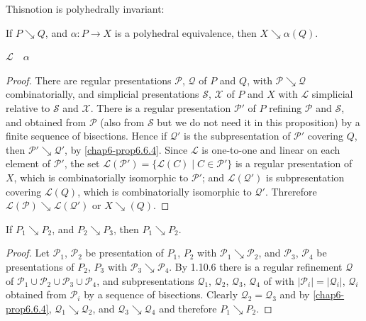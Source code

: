 This\pageoriginale notion is polyhedrally invariant:

\begin{proposition}\label{chap6-prop6.6.6}
If $P\searrow Q$, and $\alpha:P\to X$ is a polyhedral equivalence, then $X\searrow \alpha(Q)$.
\end{proposition}
$\mathcal{L} \quad  \alpha$
\begin{proof}
There are regular presentations $\mathscr{P}$, $\mathcal{Q}$ of $P$ and $Q$, with $\mathscr{P}\searrow \mathcal{Q}$ combinatorially, and simplicial presentations $\mathscr{S}$, $\mathscr{X}$ of $P$ and $X$ with $\mathcal{L}$ simplicial relative to $\mathscr{S}$ and $\mathscr{X}$. There is a regular presentation $\mathscr{P}'$ of $P$ refining $\mathscr{P}$ and $\mathscr{S}$, and obtained from $\mathscr{P}$ (also from $\mathscr{S}$ but we do not need it in this proposition) by a finite sequence of bisections. Hence if $\mathcal{Q}'$ is the subpresentation of $\mathscr{P}'$ covering $Q$, then $\mathscr{P}'\searrow \mathcal{Q}'$, by \ref{chap6-prop6.6.4}. Since $\mathcal{L}$ is one-to-one and linear on each element of $\mathscr{P}'$, the set $\mathcal{L}(\mathscr{P}')=\{\mathcal{L}(C)\mid C\in \mathscr{P}'\}$ is a regular presentation of $X$, which is combinatorially isomorphic to $\mathscr{P}'$; and $\mathcal{L}(\mathcal{Q}')$ is subpresentation covering $\mathcal{L}(Q)$, which is combinatorially isomorphic to $\mathcal{Q}'$. Threrefore $\mathcal{L}(\mathscr{P})\searrow \mathcal{L}(\mathcal{Q}')$ or $X\searrow (Q)$.
\end{proof}

\begin{proposition}\label{chap6-prop6.6.7}
If $P_{1}\searrow P_{2}$, and $P_{2}\searrow P_{3}$, then $P_{1}\searrow P_{2}$.
\end{proposition}

\begin{proof}
Let $\mathscr{P}_{1}$, $\mathscr{P}_{2}$ be presentation of $P_{1}$, $P_{2}$ with $\mathscr{P}_{1}\searrow \mathscr{P}_{2}$, and $\mathscr{P}_{3}$, $\mathscr{P}_{4}$ be presentations of $P_{2}$, $P_{3}$ with $\mathscr{P}_{3}\searrow \mathscr{P}_{4}$. By 1.10.6 there is a regular refinement $\mathcal{Q}$ of $\mathscr{P}_{1}\cup \mathscr{P}_{2}\cup \mathscr{P}_{3}\cup \mathscr{P}_{4}$, and subpresentations $\mathcal{Q}_{1}$, $\mathcal{Q}_{2}$, $\mathcal{Q}_{3}$, $\mathcal{Q}_{4}$ of with $|\mathscr{P}_{i}|=|\mathcal{Q}_{i}|$, $\mathcal{Q}_{i}$ obtained from $\mathscr{P}_{i}$ by a sequence of bisections. Clearly $\mathcal{Q}_{2}=\mathcal{Q}_{3}$ and by \ref{chap6-prop6.6.4}, $\mathcal{Q}_{1}\searrow \mathcal{Q}_{2}$, and $\mathcal{Q}_{3}\searrow \mathcal{Q}_{4}$ and therefore $P_{1}\searrow P_{2}$.
\end{proof}

